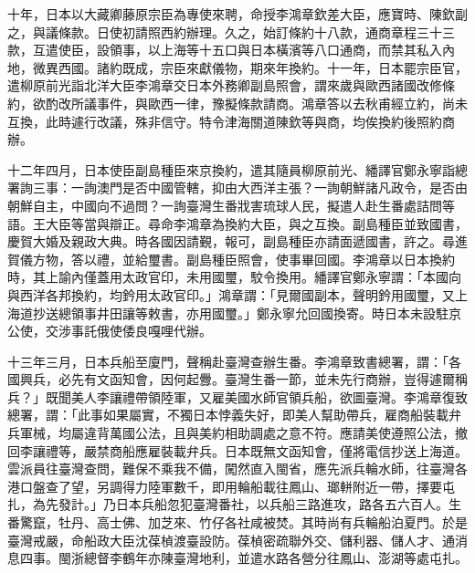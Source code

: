 \begin{pinyinscope}
十年，日本以大藏卿藤原宗臣為專使來聘，命授李鴻章欽差大臣，應寶時、陳欽副之，與議條款。日使初請照西約辦理。久之，始訂條約十八款，通商章程三十三款，互遣使臣，設領事，以上海等十五口與日本橫濱等八口通商，而禁其私入內地，微異西國。諸約既成，宗臣來獻儀物，期來年換約。十一年，日本罷宗臣官，遣柳原前光詣北洋大臣李鴻章交日本外務卿副島照會，謂來歲與歐西諸國改修條約，欲酌改所議事件，與歐西一律，豫擬條款請商。鴻章答以去秋甫經立約，尚未互換，此時遽行改議，殊非信守。特令津海關道陳欽等與商，均俟換約後照約商辦。

十二年四月，日本使臣副島種臣來京換約，遣其隨員柳原前光、繙譯官鄭永寧詣總署詢三事：一詢澳門是否中國管轄，抑由大西洋主張？一詢朝鮮諸凡政令，是否由朝鮮自主，中國向不過問？一詢臺灣生番戕害琉球人民，擬遣人赴生番處詰問等語。王大臣等當與辯正。尋命李鴻章為換約大臣，與之互換。副島種臣並致國書，慶賀大婚及親政大典。時各國因請覲，報可，副島種臣亦請面遞國書，許之。尋進賀儀方物，答以禮，並給璽書。副島種臣照會，使事畢回國。李鴻章以日本換約時，其上諭內僅蓋用太政官印，未用國璽，駮令換用。繙譯官鄭永寧謂：「本國向與西洋各邦換約，均鈐用太政官印。」鴻章謂：「見爾國副本，聲明鈐用國璽，又上海道抄送總領事井田讓等敕書，亦用國璽。」鄭永寧允回國換寄。時日本未設駐京公使，交涉事託俄使倭良嘎哩代辦。

十三年三月，日本兵船至廈門，聲稱赴臺灣查辦生番。李鴻章致書總署，謂：「各國興兵，必先有文函知會，因何起釁。臺灣生番一節，並未先行商辦，豈得遽爾稱兵？」既聞美人李讓禮帶領陸軍，又雇美國水師官領兵船，欲圖臺灣。李鴻章復致總署，謂：「此事如果屬實，不獨日本悖義失好，即美人幫助帶兵，雇商船裝載弁兵軍械，均屬違背萬國公法，且與美約相助調處之意不符。應請美使遵照公法，撤回李讓禮等，嚴禁商船應雇裝載弁兵。日本既無文函知會，僅將電信抄送上海道。雲派員往臺灣查問，難保不乘我不備，闖然直入閩省，應先派兵輪水師，往臺灣各港口盤查了望，另調得力陸軍數千，即用輪船載往鳳山、瑯軿附近一帶，擇要屯扎，為先發計。」乃日本兵船忽犯臺灣番社，以兵船三路進攻，路各五六百人。生番驚竄，牡丹、高士佛、加芝來、竹仔各社咸被焚。其時尚有兵輪船泊夏門。於是臺灣戒嚴，命船政大臣沈葆楨渡臺設防。葆楨密疏聯外交、儲利器、儲人才、通消息四事。閩浙總督李鶴年亦陳臺灣地利，並遣水路各營分往鳳山、澎湖等處屯扎。


\end{pinyinscope}
